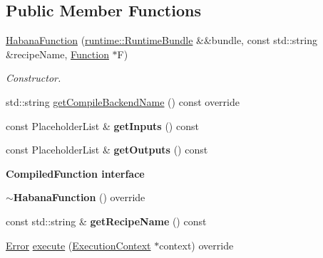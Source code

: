 \subsection*{Public Member Functions}
\begin{DoxyCompactItemize}
\item 
\mbox{\label{classglow_1_1_habana_function_a669c7275a6defd8349ea51890a462ec4}} 
\hyperlink{classglow_1_1_habana_function_a669c7275a6defd8349ea51890a462ec4}{Habana\+Function} (\hyperlink{classglow_1_1runtime_1_1_runtime_bundle}{runtime\+::\+Runtime\+Bundle} \&\&bundle, const std\+::string \&recipe\+Name, \hyperlink{classglow_1_1_function}{Function} $\ast$F)
\begin{DoxyCompactList}\small\item\em Constructor. \end{DoxyCompactList}\item 
std\+::string \hyperlink{classglow_1_1_habana_function_a6bafdb9b97ae532ecc58edbba6e74daf}{get\+Compile\+Backend\+Name} () const override
\item 
\mbox{\label{classglow_1_1_habana_function_ac950d8d51afade66739f1812716abdfa}} 
const Placeholder\+List \& {\bfseries get\+Inputs} () const
\item 
\mbox{\label{classglow_1_1_habana_function_aab395244c0044358ff6066800c28184f}} 
const Placeholder\+List \& {\bfseries get\+Outputs} () const
\end{DoxyCompactItemize}
\begin{Indent}\textbf{ Compiled\+Function interface}\par
\begin{DoxyCompactItemize}
\item 
\mbox{\label{classglow_1_1_habana_function_a6743d8e944ddac5ad3e034376f6c5130}} 
{\bfseries $\sim$\+Habana\+Function} () override
\item 
\mbox{\label{classglow_1_1_habana_function_ac40e40838f27ed4cd187b1158786dc31}} 
const std\+::string \& {\bfseries get\+Recipe\+Name} () const
\item 
\hyperlink{namespaceglow_afdb176c3a672ef66db0ecfc19a8d39bf}{Error} \hyperlink{classglow_1_1_habana_function_ad3984e53ddb4615368e53acdc2418890}{execute} (\hyperlink{classglow_1_1_execution_context}{Execution\+Context} $\ast$context) override
\end{DoxyCompactItemize}
\end{Indent}
